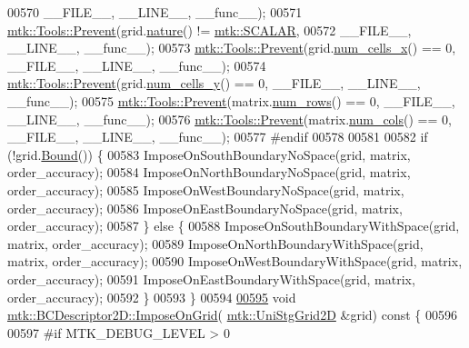 \begin{DoxyCode}
00570                       \_\_FILE\_\_, \_\_LINE\_\_, \_\_func\_\_);
00571   \hyperlink{classmtk_1_1Tools_a332324c6f25e66be9dff48c5987a3b9f}{mtk::Tools::Prevent}(grid.\hyperlink{classmtk_1_1UniStgGrid2D_a99a3a9cdb05b7306be99bde935509e30}{nature}() != \hyperlink{namespacemtk_ga4c54f2a329cfb4e56213b02a259d19e2af481d45bd70d41381c7d72e200889205}{mtk::SCALAR},
00572                       \_\_FILE\_\_, \_\_LINE\_\_, \_\_func\_\_);
00573   \hyperlink{classmtk_1_1Tools_a332324c6f25e66be9dff48c5987a3b9f}{mtk::Tools::Prevent}(grid.\hyperlink{classmtk_1_1UniStgGrid2D_a2d182866a398aba8e4829590e85bf939}{num\_cells\_x}() == 0, \_\_FILE\_\_, \_\_LINE\_\_, \_\_func\_\_);
00574   \hyperlink{classmtk_1_1Tools_a332324c6f25e66be9dff48c5987a3b9f}{mtk::Tools::Prevent}(grid.\hyperlink{classmtk_1_1UniStgGrid2D_aed05a801cc9a76dba0ff203cea58a61a}{num\_cells\_y}() == 0, \_\_FILE\_\_, \_\_LINE\_\_, \_\_func\_\_);
00575   \hyperlink{classmtk_1_1Tools_a332324c6f25e66be9dff48c5987a3b9f}{mtk::Tools::Prevent}(matrix.\hyperlink{classmtk_1_1DenseMatrix_a53f3afb3b6a8d21854458aaa9663cc74}{num\_rows}() == 0, \_\_FILE\_\_, \_\_LINE\_\_, \_\_func\_\_);
00576   \hyperlink{classmtk_1_1Tools_a332324c6f25e66be9dff48c5987a3b9f}{mtk::Tools::Prevent}(matrix.\hyperlink{classmtk_1_1DenseMatrix_a41747502d468c6728a4be31501b16e0e}{num\_cols}() == 0, \_\_FILE\_\_, \_\_LINE\_\_, \_\_func\_\_);
00577 \textcolor{preprocessor}{  #endif}
00578 
00581 
00582   \textcolor{keywordflow}{if} (!grid.\hyperlink{classmtk_1_1UniStgGrid2D_aa651194ccd0321a7c61a8f56fa5e8455}{Bound}()) \{
00583     ImposeOnSouthBoundaryNoSpace(grid, matrix, order\_accuracy);
00584     ImposeOnNorthBoundaryNoSpace(grid, matrix, order\_accuracy);
00585     ImposeOnWestBoundaryNoSpace(grid, matrix, order\_accuracy);
00586     ImposeOnEastBoundaryNoSpace(grid, matrix, order\_accuracy);
00587   \} \textcolor{keywordflow}{else} \{
00588     ImposeOnSouthBoundaryWithSpace(grid, matrix, order\_accuracy);
00589     ImposeOnNorthBoundaryWithSpace(grid, matrix, order\_accuracy);
00590     ImposeOnWestBoundaryWithSpace(grid, matrix, order\_accuracy);
00591     ImposeOnEastBoundaryWithSpace(grid, matrix, order\_accuracy);
00592   \}
00593 \}
00594 
\hypertarget{mtk__bc__descriptor__2d_8cc_source_l00595}{}\hyperlink{classmtk_1_1BCDescriptor2D_a5f0ff1fda1b5266dcd77ba2301c8ba2c}{00595} \textcolor{keywordtype}{void} \hyperlink{classmtk_1_1BCDescriptor2D_a5f0ff1fda1b5266dcd77ba2301c8ba2c}{mtk::BCDescriptor2D::ImposeOnGrid}(
      \hyperlink{classmtk_1_1UniStgGrid2D}{mtk::UniStgGrid2D} &grid)\textcolor{keyword}{ const }\{
00596 
00597 \textcolor{preprocessor}{  #if MTK\_DEBUG\_LEVEL > 0}

\end{DoxyCode}
